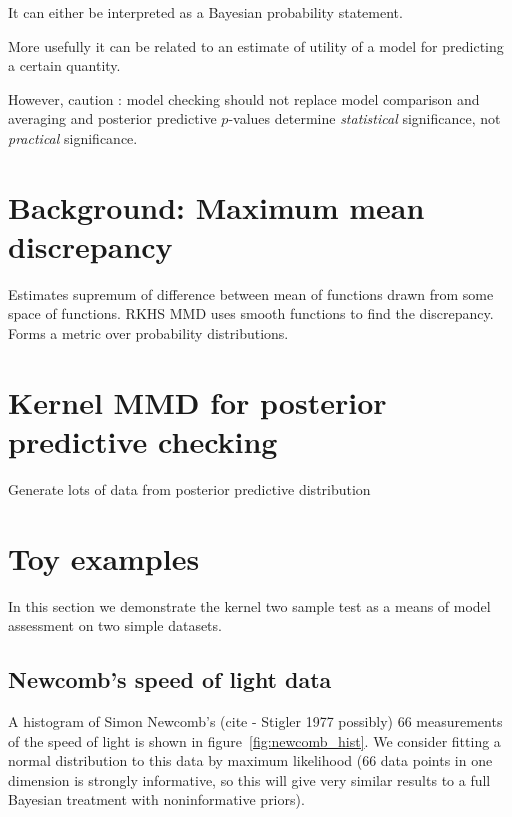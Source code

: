 \documentclass{article}
\begin{document}
It can either be interpreted as a Bayesian probability statement.

More usefully it can be related to an estimate of utility of a model for predicting a certain quantity.

However, caution : model checking should not replace model comparison and averaging and posterior predictive $p$-values determine \emph{statistical} significance, not \emph{practical} significance.

\section{Background: Maximum mean discrepancy}

Estimates supremum of difference between mean of functions drawn from some space of functions.
RKHS MMD uses smooth functions to find the discrepancy.
Forms a metric over probability distributions.

\section{Kernel MMD for posterior predictive checking}

Generate lots of data from posterior predictive distribution

\section{Toy examples}

In this section we demonstrate the kernel two sample test as a means of model assessment on two simple datasets.

\subsection{Newcomb's speed of light data}

A histogram of Simon Newcomb's (cite - Stigler 1977 possibly) 66 measurements of the speed of light is shown in figure~\ref{fig:newcomb_hist}.
We consider fitting a normal distribution to this data by maximum likelihood (66 data points in one dimension is strongly informative, so this will give very similar results to a full Bayesian treatment with noninformative priors).
\end{document}
